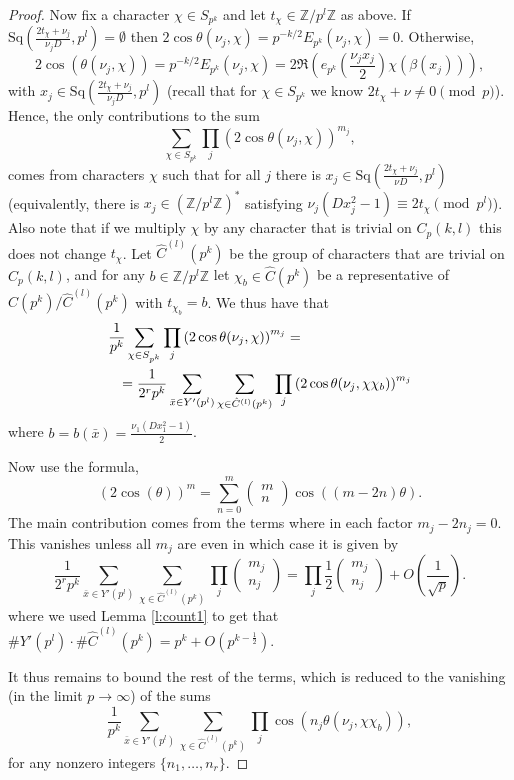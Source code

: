 \documentclass[12pt]{amsart}
\theoremstyle{definition}
\theoremstyle{remark}
\numberwithin{equation}{section}
\newcommand{\bbZ}{\mathbb{Z}}
\newcommand{\Sq}{\mathrm{Sq}}
\begin{document}
\begin{proof}
Now fix a character $\chi\in S_{p^k}$ and let
$t_\chi\in\bbZ/p^l\bbZ$ as above. If $\Sq(\frac{2t_\chi+\nu_j}{\nu_j
D},p^l)=\emptyset$ then
$2\cos\theta(\nu_j,\chi)=p^{-k/2}E_{p^k}(\nu_j,\chi)=0$. Otherwise,
\[2\cos(\theta(\nu_j,\chi))=p^{-{k/2}}E_{p^k}(\nu_j,\chi)=2\Re(e_{p^k}(\frac{\nu_j x_j}{2})\chi(\beta(x_j))),\]
with $x_j\in\Sq(\frac{2t_\chi+\nu_j}{\nu_j D},p^l)$ (recall that for
$\chi\in S_{p^k}$ we know $2t_\chi+\nu\neq 0\pmod{p}$). Hence, the
only contributions to the sum
\[\sum_{\chi\in S_{p^k}}\prod_{j} \left(2\cos\theta(\nu_j,\chi)\right)^{m_j},\]
comes from characters $\chi$ such that for all $j$ there is
$x_j\in\Sq(\frac{2t_\chi+\nu_j}{\nu D},p^l)$ (equivalently, there is
$x_j\in(\bbZ/p^l\bbZ)^*$ satisfying $\nu_j(Dx_j^2-1)\equiv
2t_\chi\pmod{p^l}$). Also note that if we multiply $\chi$ by any
character that is trivial on $C_p(k,l)$ this does not change
$t_\chi$. Let $\hat C^{(l)}(p^k)$ be the group of characters that
are trivial on $C_p(k,l)$, and for any $b\in\bbZ/p^l\bbZ$ let
$\chi_b\in \hat C(p^k)$ be a representative of $\hat C(p^k)/\hat
C^{(l)}(p^k)$ with $t_{\chi_b}=b$. We thus have that
\begin{eqnarray*}\lefteqn{\frac{1}{p^k}\sum_{\chi\in S_{p^k}}\prod_{j} \left(2\cos\theta(\nu_j,\chi)\right)^{m_j}=}\\
&&=\frac{1}{2^rp^k}\sum_{\bar{x}\in Y'(p^l)}\sum_{\chi\in \hat
C^{(l)}(p^k)}
\prod_{j}\left(2\cos\theta(\nu_j,\chi\chi_b)\right)^{m_j}
\end{eqnarray*}
where $b=b(\bar{x})=\frac{\nu_1(Dx_1^2-1)}{2}$.


Now use the formula,
\[(2\cos(\theta))^m=\sum_{n=0}^m\begin{pmatrix} m\\n\end{pmatrix}\cos((m-2n)\theta).\]
The main contribution comes from the terms where in each factor
$m_j-2n_j=0$. This vanishes unless all $m_j$ are even in which case
it is given by
\[\frac{1}{2^rp^k}\sum_{\bar{x}\in Y'(p^l)}\sum_{\chi\in \hat C^{(l)}(p^k)}
\prod_{j}\begin{pmatrix} m_j\\
n_j\end{pmatrix}=\prod_{j}\frac{1}{2}\begin{pmatrix} m_j\\
n_j\end{pmatrix}+O(\frac{1}{\sqrt{p}}).\] where we used Lemma
\ref{l:count1} to get that $\# Y'(p^l)\cdot\# \hat
C^{(l)}(p^k)=p^k+O(p^{k-\frac{1}{2}})$.


It thus remains to bound the rest of the terms, which is reduced to
the vanishing (in the limit $p\to\infty$) of the sums
\[\frac{1}{p^k}\sum_{\bar{x}\in Y'(p^l)}\sum_{\chi\in \hat C^{(l)}(p^k)}
\prod_{j}\cos(n_j\theta(\nu_j,\chi\chi_b)),\] for any nonzero
integers $\{n_1,\ldots, n_r\}$.


\end{proof}
\end{document}
